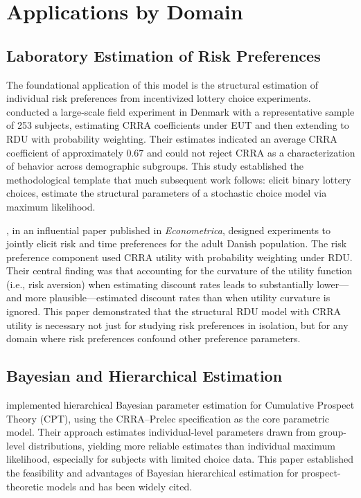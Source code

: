 \documentclass[12pt,a4paper]{article}
\begin{document}
\section{Applications by Domain}

\subsection{Laboratory Estimation of Risk Preferences}

The foundational application of this model is the structural estimation of
individual risk preferences from incentivized lottery choice experiments.
\textcite{Harrison2007} conducted a large-scale field experiment in Denmark
with a representative sample of 253 subjects, estimating CRRA coefficients
under EUT and then extending to RDU with probability weighting. Their estimates
indicated an average CRRA coefficient of approximately 0.67 and could not
reject CRRA as a characterization of behavior across demographic subgroups.
This study established the methodological template that much subsequent work
follows: elicit binary lottery choices, estimate the structural parameters of a
stochastic choice model via maximum likelihood.

\textcite{Andersen2008}, in an influential paper published in
\textit{Econometrica}, designed experiments to jointly elicit risk and time
preferences for the adult Danish population. The risk preference component used
CRRA utility with probability weighting under RDU. Their central finding was
that accounting for the curvature of the utility function (i.e., risk aversion)
when estimating discount rates leads to substantially lower---and more
plausible---estimated discount rates than when utility curvature is ignored.
This paper demonstrated that the structural RDU model with CRRA utility is
necessary not just for studying risk preferences in isolation, but for any
domain where risk preferences confound other preference parameters.

\subsection{Bayesian and Hierarchical Estimation}

\textcite{Nilsson2011} implemented hierarchical Bayesian parameter estimation
for Cumulative Prospect Theory (CPT), using the CRRA--Prelec specification as
the core parametric model. Their approach estimates individual-level parameters
drawn from group-level distributions, yielding more reliable estimates than
individual maximum likelihood, especially for subjects with limited choice
data. This paper established the feasibility and advantages of Bayesian
hierarchical estimation for prospect-theoretic models and has been widely cited.
\end{document}

